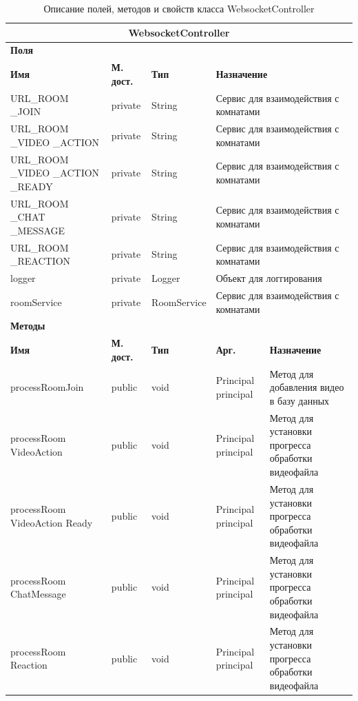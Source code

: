 \documentclass{../includes/TechDoc}
\begin{document}
    \begin{table}[h]
        \caption{\label{tab:class-AuthConfirmView-table}Описание полей, методов и свойств класса WebsocketController}
        \begin{tabularx}{\textwidth}{|p{3.2cm}|l|l|l|X|}
            \hline
            \multicolumn{5}{|c|}{WebsocketController} \\ \hline
            \multicolumn{5}{|l|}{\textbf{Поля}} \\ \hline
            \textbf{Имя} & \textbf{М. дост.} & \textbf{Тип} & \multicolumn{2}{|l|}{\textbf{Назначение}} \\ \hline
            URL\_ROOM \_JOIN & private & String & \multicolumn{2}{|l|}{Сервис для взаимодействия с комнатами} \\ \hline
            URL\_ROOM \_VIDEO \_ACTION & private & String & \multicolumn{2}{|l|}{Сервис для взаимодействия с комнатами} \\ \hline
            URL\_ROOM \_VIDEO \_ACTION \_READY & private & String & \multicolumn{2}{|l|}{Сервис для взаимодействия с комнатами} \\ \hline
            URL\_ROOM \_CHAT \_MESSAGE & private & String & \multicolumn{2}{|l|}{Сервис для взаимодействия с комнатами} \\ \hline
            URL\_ROOM \_REACTION & private & String & \multicolumn{2}{|l|}{Сервис для взаимодействия с комнатами} \\ \hline
            logger & private & Logger & \multicolumn{2}{|l|}{Объект для логгирования} \\ \hline
            roomService & private & RoomService & \multicolumn{2}{|l|}{Сервис для взаимодействия с комнатами} \\ \hline
            \multicolumn{5}{|l|}{\textbf{Методы}} \\ \hline
            \textbf{Имя}                  & \textbf{М. дост.} & \textbf{Тип} & \textbf{Арг.}       & \textbf{Назначение}                                \\ \hline
            processRoomJoin               & public            & void         & Principal principal & Метод для добавления видео в базу данных           \\ \hline
            processRoom VideoAction       & public            & void         & Principal principal & Метод для установки прогресса обработки видеофайла \\ \hline
            processRoom VideoAction Ready & public            & void         & Principal principal & Метод для установки прогресса обработки видеофайла \\ \hline
            processRoom ChatMessage       & public            & void         & Principal principal & Метод для установки прогресса обработки видеофайла \\ \hline
            processRoom Reaction          & public            & void         & Principal principal & Метод для установки прогресса обработки видеофайла \\ \hline
        \end{tabularx}
    \end{table}
\end{document}
